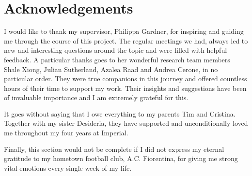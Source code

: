 \vspace*{\fill}
	\section*{Acknowledgements}
	
	I would like to thank my supervisor, Philippa Gardner, for inspiring and guiding me through the course of this project. The regular meetings we had, always led to new and interesting questions around the topic and were filled with helpful feedback. A particular thanks goes to her wonderful research team members Shale Xiong, Julian Sutherland, Azalea Raad and Andrea Cerone, in no particular order. They were true companions in this journey and offered countless hours of their time to support my work. Their insights and suggestions have been of invaluable importance and I am extremely grateful for this.
	
	It goes without saying that I owe everything to my parents Tim and Cristina. Together with my sister Desideria, they have supported and unconditionally loved me throughout my four years at Imperial.
	
	Finally, this section would not be complete if I did not express my eternal gratitude to my hometown football club, A.C. Fiorentina, for giving me strong vital emotions every single week of my life.
\vspace*{\fill}